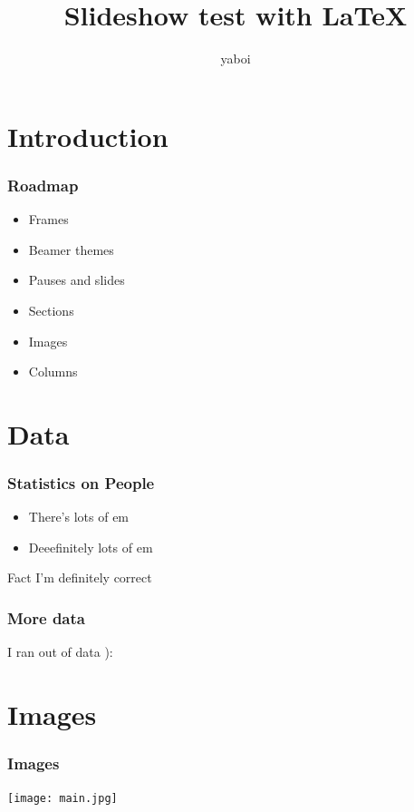 \documentclass{beamer}
\title{Slideshow test with {\LaTeX}}
\author{yaboi}
\begin{document}
\maketitle

\section{Introduction}

\begin{frame}
\frametitle{Roadmap}

\begin{itemize}
\item Frames\pause
\item Beamer themes\pause
\item Pauses and slides\pause
\item Sections\pause
\item Images\pause
\item Columns
\end{itemize}

\end{frame}

\section{Data}

\begin{frame}
\frametitle{Statistics on People}

\begin{itemize}
	\item There's lots of em
	\item Deeefinitely lots of em
\end{itemize}

\begin{block}{Fact}
	I'm definitely correct
\end{block}

\end{frame}

\begin{frame}
\frametitle{More data}

I ran out of data ):

\end{frame}

\section{Images}

\begin{frame}
\frametitle{Images}

\begin{centering}
	\texttt{[image: main.jpg]}
\end{centering}


\end{frame}
\end{document}
